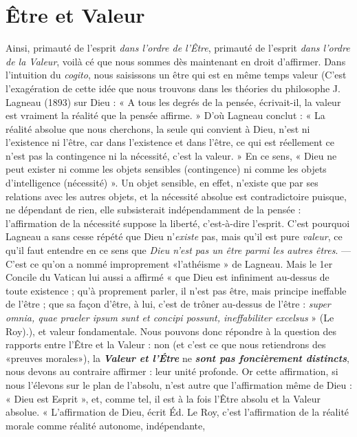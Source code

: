 \section{Être et Valeur}%
Ainsi, primauté de l'esprit {\it dans
l'ordre de l’Être}, primauté de l'esprit {\it dans l’ordre de la Valeur}, voilà
cé que nous sommes dès maintenant en droit d’affirmer. Dans l’intuition
du {\it cogito}, nous saisissons un être qui est en même temps valeur
{\footnotesize (C'est l'exagération de cette idée que nous trouvons dans les théories du philosophe
J. Lagneau (1893) sur Dieu : « A tous les degrés de la pensée, écrivait-il, la valeur
est vraiment la réalité que la pensée affirme. » D'où Lagneau conclut : « La réalité
absolue que nous cherchons, la seule qui convient à Dieu, n’est ni l'existence ni l'être,
car dans l'existence et dans l’être, ce qui est réellement ce n’est pas la contingence ni la
nécessité, c’est la valeur. » En ce sens, « Dieu ne peut exister ni comme les objets sensibles
(contingence) ni comme les objets d'intelligence (nécessité) ». Un objet sensible,
en effet, n'existe que par ses relations avec les autres objets, et la nécessité absolue est
contradictoire puisque, ne dépendant de rien, elle subsisterait indépendamment de la
pensée : l'affirmation de la nécessité suppose la liberté, c'est-à-dire l'esprit. C’est pourquoi
Lagneau a sans cesse répété que Dieu n'{\it existe} pas, mais qu'il est pure {\it valeur},
ce qu'il faut entendre en ce sens que {\it Dieu n'est pas un être parmi les autres êtres}. —
C’est ce qu'on a nommé improprement «l'athéisme » de Lagneau. Mais le 1er Concile
du Vatican lui aussi a affirmé « que Dieu est infiniment au-dessus de toute existence ;
qu’à proprement parler, il n'est pas être, mais principe ineffable de l'être ; que sa façon
d’être, à lui, c'est de trôner au-dessus de l’être : {\it super omnia, quae praeler ipsum sunt
et concipi possunt, ineffabiliter excelsus} » (Le Roy).)},
et valeur fondamentale. Nous pouvons donc répondre à la
question des rapports entre l’Être et la Valeur : non (et c’est ce que
nous retiendrons des «preuves morales»), la \textbf{\textit {Valeur et l'Étre}} ne
\textbf{\textit {sont pas foncièrement distincts}}, nous devons au contraire affirmer :
leur unité profonde. Or cette affirmation, si nous l’élevons sur le plan
de l’absolu, n’est autre que l’affirmation même de Dieu : « Dieu est
Esprit », et, comme tel, il est à la fois l’Être absolu et la Valeur
absolue. « L’affirmation de Dieu, écrit Éd. Le Roy, c’est l’affirmation
de la réalité morale comme réalité autonome, indépendante,
